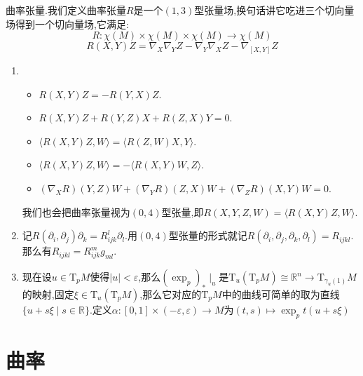 曲率张量.我们定义曲率张量$R$是一个$(1,3)$型张量场,换句话讲它吃进三个切向量场得到一个切向量场,它满足:
$$R:\chi(M)\times\chi(M)\times\chi(M)\to\chi(M)$$
$$R(X,Y)Z=\nabla_X\nabla_YZ-\nabla_Y\nabla_XZ-\nabla_{[X,Y]}Z$$
\begin{enumerate}
	\item 
	\begin{itemize}
		\item $R(X,Y)Z=-R(Y,X)Z$.
		\item $R(X,Y)Z+R(Y,Z)X+R(Z,X)Y=0$.
		\item $\langle R(X,Y)Z,W\rangle=\langle R(Z,W)X,Y\rangle$.
		\item $\langle R(X,Y)Z,W\rangle=-\langle R(X,Y)W,Z\rangle$.
		\item $(\nabla_XR)(Y,Z)W+(\nabla_YR)(Z,X)W+(\nabla_ZR)(X,Y)W=0$.
	\end{itemize}

    我们也会把曲率张量视为$(0,4)$型张量,即$R(X,Y,Z,W)=\langle R(X,Y)Z,W\rangle$.
    \item 记$R(\partial_i,\partial_j)\partial_k=R_{ijk}^l\partial_l$.用$(0,4)$型张量的形式就记$R(\partial_i,\partial_j,\partial_k,\partial_l)=R_{ijkl}$.那么有$R_{ijkl}=R_{ijk}^mg_{ml}$.
    \item 现在设$u\in\mathrm{T}_pM$使得$|u|<\varepsilon$,那么$(\exp_p)_*\mid_u$是$\mathrm{T}_u(\mathrm{T}_pM)\cong\mathbb{R}^n\to\mathrm{T}_{\gamma_u(1)}M$的映射,固定$\xi\in\mathrm{T}_u(\mathrm{T}_pM)$,那么它对应的$\mathrm{T}_pM$中的曲线可简单的取为直线$\{u+s\xi\mid s\in\mathbb{R}\}$.定义$\alpha:[0,1]\times(-\varepsilon,\varepsilon)\to M$为$(t,s)\mapsto\exp_pt(u+s\xi)$
\end{enumerate}



\newpage
\section{曲率}